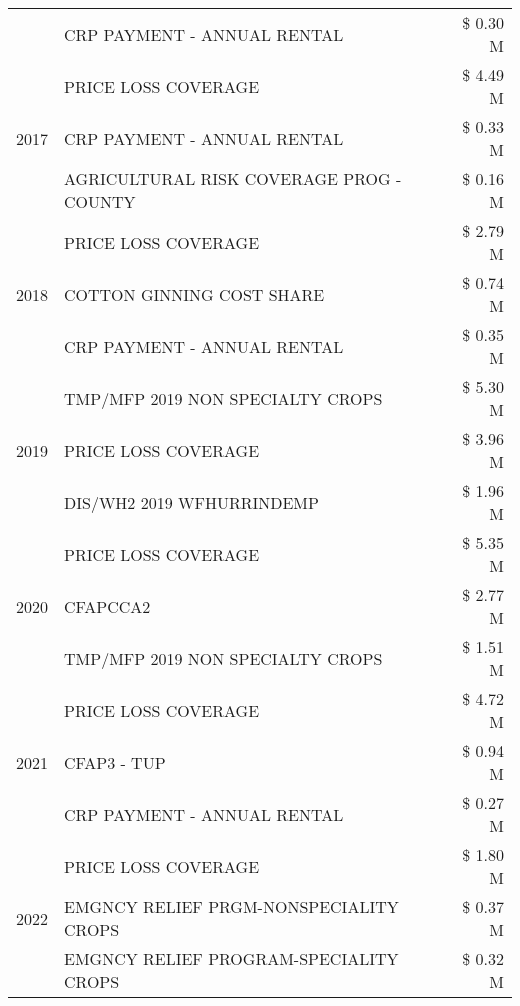 \begin{tabular}{llr}
 & CRP PAYMENT - ANNUAL RENTAL & \$ 0.30 M \\
\cline{1-3}
\multirow[t]{3}{*}{2017} & PRICE LOSS COVERAGE & \$ 4.49 M \\
 & CRP PAYMENT - ANNUAL RENTAL & \$ 0.33 M \\
 & AGRICULTURAL RISK COVERAGE PROG - COUNTY & \$ 0.16 M \\
\cline{1-3}
\multirow[t]{3}{*}{2018} & PRICE LOSS COVERAGE & \$ 2.79 M \\
 & COTTON GINNING COST SHARE & \$ 0.74 M \\
 & CRP PAYMENT - ANNUAL RENTAL & \$ 0.35 M \\
\cline{1-3}
\multirow[t]{3}{*}{2019} & TMP/MFP 2019 NON SPECIALTY CROPS & \$ 5.30 M \\
 & PRICE LOSS COVERAGE & \$ 3.96 M \\
 & DIS/WH2 2019 WFHURRINDEMP & \$ 1.96 M \\
\cline{1-3}
\multirow[t]{3}{*}{2020} & PRICE LOSS COVERAGE & \$ 5.35 M \\
 & CFAPCCA2 & \$ 2.77 M \\
 & TMP/MFP 2019 NON SPECIALTY CROPS & \$ 1.51 M \\
\cline{1-3}
\multirow[t]{3}{*}{2021} & PRICE LOSS COVERAGE & \$ 4.72 M \\
 & CFAP3 - TUP & \$ 0.94 M \\
 & CRP PAYMENT - ANNUAL RENTAL & \$ 0.27 M \\
\cline{1-3}
\multirow[t]{3}{*}{2022} & PRICE LOSS COVERAGE & \$ 1.80 M \\
 & EMGNCY RELIEF PRGM-NONSPECIALITY CROPS & \$ 0.37 M \\
 & EMGNCY RELIEF PROGRAM-SPECIALITY CROPS & \$ 0.32 M \\
\cline{1-3}
\bottomrule
\end{tabular}
